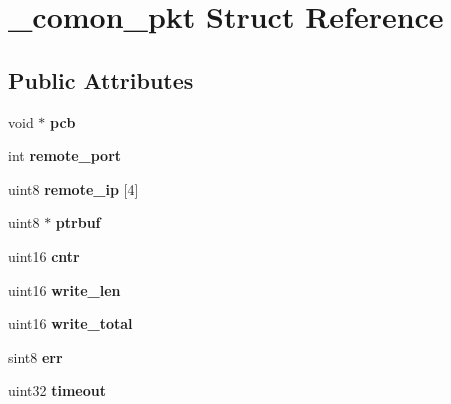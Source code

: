 \hypertarget{struct__comon__pkt}{}\section{\+\_\+comon\+\_\+pkt Struct Reference}
\label{struct__comon__pkt}
\subsection*{Public Attributes}
\begin{DoxyCompactItemize}
\item 
\hypertarget{struct__comon__pkt_af4c42e00ad95ad06e4e39d6d52198d72}{}void $\ast$ {\bfseries pcb}\label{struct__comon__pkt_af4c42e00ad95ad06e4e39d6d52198d72}

\item 
\hypertarget{struct__comon__pkt_ac097235fe98758b23ddf3323512ab099}{}int {\bfseries remote\+\_\+port}\label{struct__comon__pkt_ac097235fe98758b23ddf3323512ab099}

\item 
\hypertarget{struct__comon__pkt_a44103127fc8d935b5ccba8c792d3b9ba}{}uint8 {\bfseries remote\+\_\+ip} \mbox{[}4\mbox{]}\label{struct__comon__pkt_a44103127fc8d935b5ccba8c792d3b9ba}

\item 
\hypertarget{struct__comon__pkt_af03e83142eecec7bbe9a77e8cf98b237}{}uint8 $\ast$ {\bfseries ptrbuf}\label{struct__comon__pkt_af03e83142eecec7bbe9a77e8cf98b237}

\item 
\hypertarget{struct__comon__pkt_a5310f16643f52cd859354bd749d64088}{}uint16 {\bfseries cntr}\label{struct__comon__pkt_a5310f16643f52cd859354bd749d64088}

\item 
\hypertarget{struct__comon__pkt_a2de0f578e4a0e52f9c3d220840e09b86}{}uint16 {\bfseries write\+\_\+len}\label{struct__comon__pkt_a2de0f578e4a0e52f9c3d220840e09b86}

\item 
\hypertarget{struct__comon__pkt_a52d9aa206b8a7764d52e19a4dd06c1e9}{}uint16 {\bfseries write\+\_\+total}\label{struct__comon__pkt_a52d9aa206b8a7764d52e19a4dd06c1e9}

\item 
\hypertarget{struct__comon__pkt_aa245af3b304a4607035d17d0090f4ff5}{}sint8 {\bfseries err}\label{struct__comon__pkt_aa245af3b304a4607035d17d0090f4ff5}

\item 
\hypertarget{struct__comon__pkt_a3f24f5fef7de8580139a22c10786f4b5}{}uint32 {\bfseries timeout}\label{struct__comon__pkt_a3f24f5fef7de8580139a22c10786f4b5}


\end{DoxyCompactItemize}
